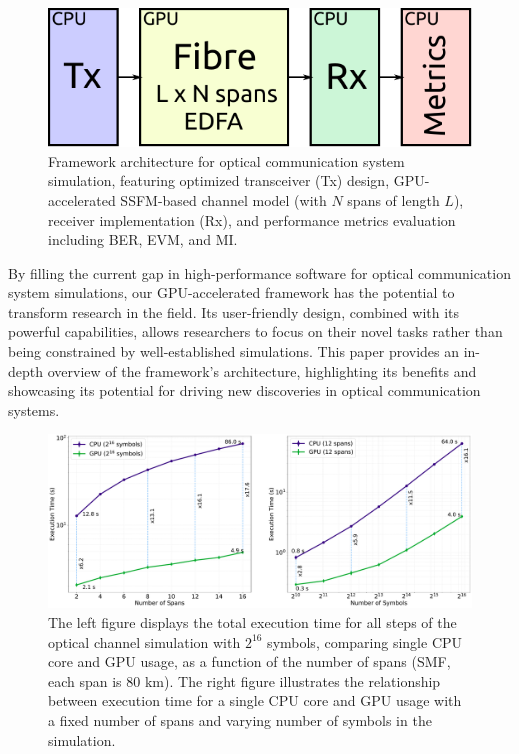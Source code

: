 \begin{figure}[t]
   \centering
        \includegraphics[width=0.8\linewidth]{images/hpcom/hpcom_scheme.pdf}
    \caption{Framework architecture for optical communication system simulation, featuring optimized transceiver (Tx) design, GPU-accelerated SSFM-based channel model (with $N$ spans of length $L$), receiver implementation (Rx), and performance metrics evaluation including BER, EVM, and MI.}
    \label{fig:hpcom_scheme}
\end{figure}

By filling the current gap in high-performance software for optical communication system simulations, our GPU-accelerated framework has the potential to transform research in the field. Its user-friendly design, combined with its powerful capabilities, allows researchers to focus on their novel tasks rather than being constrained by well-established simulations. This paper provides an in-depth overview of the framework's architecture, highlighting its benefits and showcasing its potential for driving new discoveries in optical communication systems.

\begin{figure}[t]
   \centering
    \includegraphics[width=1\linewidth]{images/hpcom/total.pdf}
    \caption{The left figure displays the total execution time for all steps of the optical channel simulation with $2^{16}$ symbols, comparing single CPU core and GPU usage, as a function of the number of spans (SMF, each span is 80 km). The right figure illustrates the relationship between execution time for a single CPU core and GPU usage with a fixed number of spans and varying number of symbols in the simulation.}
    \label{fig:total}
\end{figure}


